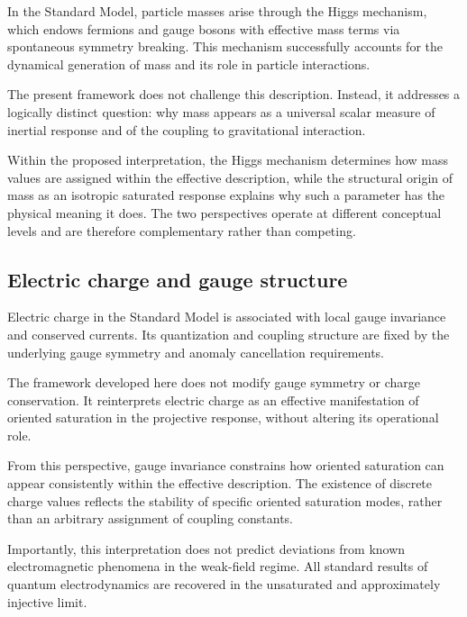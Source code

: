 \documentclass[pdflatex,sn-mathphys-num]{sn-jnl} %
\theoremstyle{remark}
\begin{document}
      In the Standard Model, particle masses arise through the Higgs mechanism,
      which endows fermions and gauge bosons with effective mass terms via
      spontaneous symmetry breaking.
      This mechanism successfully accounts for the dynamical generation of mass
      and its role in particle interactions.

      The present framework does not challenge this description.
      Instead, it addresses a logically distinct question: why mass appears as a
      universal scalar measure of inertial response and of the coupling to gravitational
      interaction.

      Within the proposed interpretation, the Higgs mechanism determines how mass
      values are assigned within the effective description, while the structural
      origin of mass as an isotropic saturated response explains why such a
      parameter has the physical meaning it does.
      The two perspectives operate at different conceptual levels and are therefore
      complementary rather than competing.

    \subsection{Electric charge and gauge structure}
      \label{subsec:sm-charge}

      Electric charge in the Standard Model is associated with local gauge
      invariance and conserved currents.
      Its quantization and coupling structure are fixed by the underlying gauge
      symmetry and anomaly cancellation requirements.

      The framework developed here does not modify gauge symmetry or charge
      conservation.
      It reinterprets electric charge as an effective manifestation of oriented
      saturation in the projective response, without altering its operational role.

      From this perspective, gauge invariance constrains how oriented saturation can
      appear consistently within the effective description.
      The existence of discrete charge values reflects the stability of specific
      oriented saturation modes, rather than an arbitrary assignment of coupling
      constants.

      Importantly, this interpretation does not predict deviations from known
      electromagnetic phenomena in the weak-field regime.
      All standard results of quantum electrodynamics are recovered in the
      unsaturated and approximately injective limit.
\end{document}
